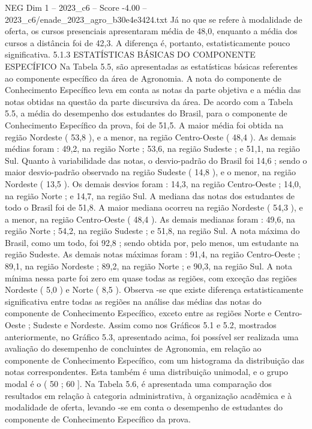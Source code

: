 \begin{textsample}{NEG Dim 1 – 2023\_c6 – Score -4.00 – 2023\_c6/enade\_2023\_agro\_b30e4e3424.txt}
Já no que se refere à modalidade de oferta, os cursos presenciais apresentaram média de 48,0, enquanto a média dos cursos a distância foi de 42,3.
A diferença é, portanto, estatisticamente pouco significativa. 5.1.3 ESTATÍSTICAS BÁSICAS DO COMPONENTE ESPECÍFICO Na Tabela 5.5, são apresentadas as estatísticas básicas referentes ao componente específico da área de Agronomia.
A nota do componente de Conhecimento Específico leva em conta as notas da parte objetiva e a média das notas obtidas na questão da parte discursiva da área.
De acordo com a Tabela 5.5, a média do desempenho dos estudantes do Brasil, para o componente de Conhecimento Específico da prova, foi de 51,5.
A maior média foi obtida na região Nordeste ( 53,8 ), e a menor, na região Centro-Oeste ( 48,4 ).
As demais médias foram : 49,2, na região Norte ; 53,6, na região Sudeste ; e 51,1, na região Sul.
Quanto à variabilidade das notas, o desvio-padrão do Brasil foi 14,6 ; sendo o maior desvio-padrão observado na região Sudeste ( 14,8 ), e o menor, na região Nordeste ( 13,5 ).
Os demais desvios foram : 14,3, na região Centro-Oeste ; 14,0, na região Norte ; e 14,7, na região Sul.
A mediana das notas dos estudantes de todo o Brasil foi de 51,8.
A maior mediana ocorreu na região Nordeste ( 54,3 ), e a menor, na região Centro-Oeste ( 48,4 ).
As demais medianas foram : 49,6, na região Norte ; 54,2, na região Sudeste ; e 51,8, na região Sul.
A nota máxima do Brasil, como um todo, foi 92,8 ; sendo obtida por, pelo menos, um estudante na região Sudeste.
As demais notas máximas foram : 91,4, na região Centro-Oeste ; 89,1, na região Nordeste ; 89,2, na região Norte ; e 90,3, na região Sul.
A nota mínima nessa parte foi zero em quase todas as regiões, com exceção das regiões Nordeste ( 5,0 ) e Norte ( 8,5 ).
Observa -se que existe diferença estatisticamente significativa entre todas as regiões na análise das médias das notas do componente de Conhecimento Específico, exceto entre as regiões Norte e Centro-Oeste ; Sudeste e Nordeste.
Assim como nos Gráficos 5.1 e 5.2, mostrados anteriormente, no Gráfico 5.3, apresentado acima, foi possível ser realizada uma avaliação do desempenho de concluintes de Agronomia, em relação ao componente de Conhecimento Específico, com um histograma da distribuição das notas correspondentes.
Esta também é uma distribuição unimodal, e o grupo modal é o ( 50 ; 60 ].
Na Tabela 5.6, é apresentada uma comparação dos resultados em relação à categoria administrativa, à organização acadêmica e à modalidade de oferta, levando -se em conta o desempenho de estudantes do componente de Conhecimento Específico da prova.

\end{textsample}
